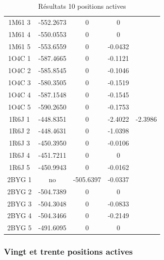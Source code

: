 \documentclass[a4paper,12pt]{article}
\begin{document}
\begin{table}[h]
\begin{tabular}{|c|c|c|c|c|}
        1M61 3 & -552.2673 & 0 & 0 & \\
        1M61 4 & -550.0553 & 0 & 0 & \\
        1M61 5 & -553.6559 & 0 & -0.0432 & \\
        1O4C 1 & -587.4665 & 0 & -0.1121 & \\
        1O4C 2 & -585.8545 & 0 & -0.1046 & \\
        1O4C 3 & -580.3505 & 0 & -0.1519 & \\
        1O4C 4 & -587.1548 & 0 & -0.1545 & \\
        1O4C 5 & -590.2650 & 0 & -0.1753 & \\
        1R6J 1 & -448.8351 & 0 & -2.4022 & -2.3986 \\
        1R6J 2 & -448.4631 & 0 & -1.0398 & \\
        1R6J 3 & -450.3950 & 0 & -0.0106 & \\
        1R6J 4 & -451.7211 & 0 & 0 & \\
        1R6J 5 & -450.9943 & 0 & -0.0162 & \\
        2BYG 1 & no & -505.6397 & -0.0337 & \\
        2BYG 2 & -504.7389 & 0 & 0 & \\
        2BYG 3 & -504.3048 & 0 & -0.0833 & \\
        2BYG 4 & -504.3466 & 0 & -0.2149 & \\
        2BYG 5 & -491.6095 & 0 & 0 & \\
        
        \hline


 \end{tabular}      
 \caption{Résultats 10 positions actives }
 \label{tab_echec2BYG__1}      
\end{table}


   \subsubsection{ Vingt et trente positions actives}
\end{document}
